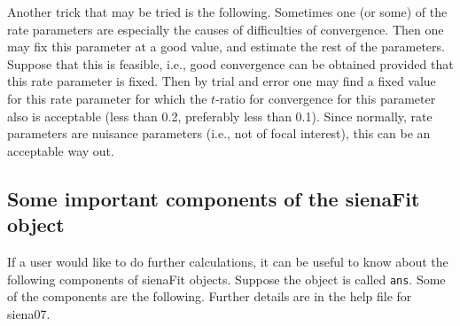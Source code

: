 \documentclass[a4paper,fleqn,11pt]{article}
\newcommand{\+}{\, + \,}
\begin{document}
Another trick that may be tried is the following.
Sometimes one (or some) of the rate parameters are especially the causes of
difficulties of convergence.
Then one may fix this parameter at a good value, and estimate the rest
of the parameters. Suppose that this is feasible, i.e., good convergence can be
obtained provided that this rate parameter is fixed. Then by trial and error
one may find a fixed value for this rate parameter for which the $t$-ratio for
convergence for this parameter also is acceptable
(less than 0.2, preferably less than 0.1).
Since normally, rate parameters are nuisance parameters (i.e., not of focal interest),
this can be an acceptable way out.



\subsection{Some important components of the \textsf{sienaFit} object}
\label{S_fitcomp}

If a user would like to do further calculations, it can be
useful to know about the following components of  \textsf{sienaFit} objects.
Suppose the object is called \texttt{ans}. Some of the components
are the following.
Further details are in the help file for \textsf{siena07}.
\end{document}
